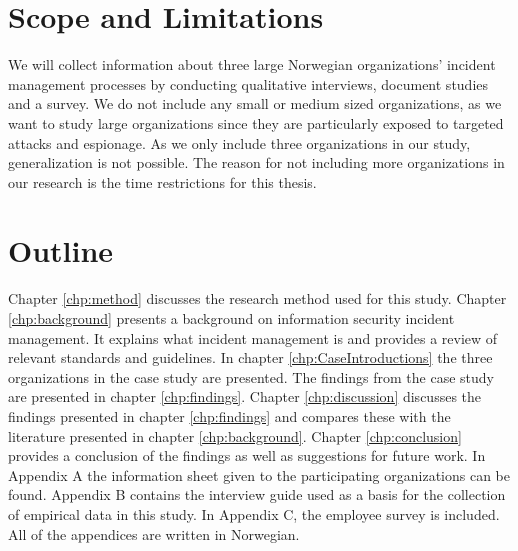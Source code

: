 \section{Scope and Limitations}
We will collect information about three large Norwegian organizations' incident management processes by conducting qualitative interviews, document studies and a survey. We do not include any small or medium sized organizations, as we want to study large organizations since they are particularly exposed to targeted attacks and espionage. As we only include three organizations in our study, generalization is not possible. The reason for not including more organizations in our research is the time restrictions for this thesis.

\section{Outline}
Chapter \ref{chp:method} discusses the research method used for this study.
Chapter \ref{chp:background} presents a background on information security incident management. It explains what incident management is and provides a review of relevant standards and guidelines. In chapter \ref{chp:CaseIntroductions} the three organizations in the case study are presented. The findings from the case study are presented in chapter \ref{chp:findings}. Chapter \ref{chp:discussion} discusses the findings presented in chapter \ref{chp:findings} and compares these with the literature presented in chapter \ref{chp:background}. Chapter \ref{chp:conclusion} provides a conclusion of the findings as well as suggestions for future work. In Appendix A the information sheet given to the participating organizations can be found. Appendix B contains the interview guide used as a basis for the collection of empirical data in this study. In Appendix C, the employee survey is included. All of the appendices are written in Norwegian.
